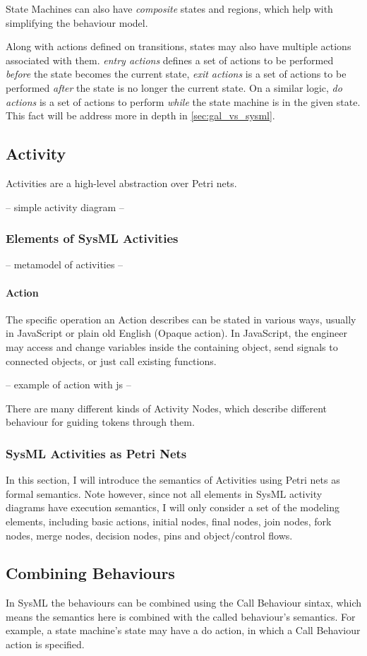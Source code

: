 State Machines can also have \emph{composite} states and regions, which help with simplifying the behaviour model.

Along with actions defined on transitions, states may also have multiple actions associated with them. \emph{entry actions} defines a set of actions to be performed \emph{before} the state becomes the current state, \emph{exit actions} is a set of actions to be performed \emph{after} the state is no longer the current state. On a similar logic, \emph{do actions} is a set of actions to perform \emph{while} the state machine is in the given state. This fact will be address more in depth in \autoref{sec:gal_vs_sysml}. 

\subsection{Activity}

Activities are a high-level abstraction over Petri nets. 

-- simple activity diagram --

\subsubsection*{Elements of SysML Activities}

-- metamodel of activities --

\paragraph{Action}

The specific operation an Action describes can be stated in various ways, usually in JavaScript or plain old English (Opaque action). In JavaScript, the engineer may access and change variables inside the containing object, send signals to connected objects, or just call existing functions.

-- example of action with js --

There are many different kinds of Activity Nodes, which describe different behaviour for guiding tokens through them.

\subsubsection*{SysML Activities as Petri Nets}

In this section, I will introduce the semantics of Activities using Petri nets as formal semantics. Note however, since not all elements in SysML activity diagrams have execution semantics, I will only consider a set of the modeling elements, including basic actions, initial nodes, final nodes, join nodes, fork nodes, merge nodes, decision nodes, pins and object/control flows.\cite{fuml}\cite{https://doi.org/10.1002/sys.21524}

\subsection{Combining Behaviours}

In SysML the behaviours can be combined using the Call Behaviour sintax, which means the semantics here is combined with the called behaviour's semantics. For example, a state machine's state may have a do action, in which a Call Behaviour action is specified. 